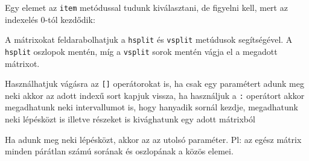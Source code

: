 \begin{python}

\end{python}

\begin{python}

\end{python}

\begin{python}

\end{python}

    Egy elemet az \texttt{item} metódussal tudunk kiválasztani, de figyelni
kell, mert az indexelés 0-tól kezdődik:

\begin{python}

\end{python}

    A mátrixokat feldarabolhatjuk a \texttt{hsplit} és \texttt{vsplit}
metúdusok segítségével. A \texttt{hsplit} oszlopok mentén, míg a
\texttt{vsplit} sorok mentén vágja el a megadott mátrixot.

\begin{python}

\end{python}

\begin{python}

\end{python}

\begin{python}

\end{python}

    Használhatjuk vágásra az \texttt{{[}{]}} operátorokat is, ha csak egy
paramétert adunk meg neki akkor az adott indexű sort kapjuk vissza, ha
használjuk a \texttt{:} operátort akkor megadhatunk neki intervallumot
is, hogy hanyadik sornál kezdje, megadhatunk neki lépésközt is illetve
részeket is kivághatunk egy adott mátrixból

\begin{python}

\end{python}

    Ha adunk meg neki lépésközt, akkor az az utolsó paraméter. Pl: az egész
mátrix minden párátlan számú sorának és oszlopának a közös elemei.

\begin{python}

\end{python}

